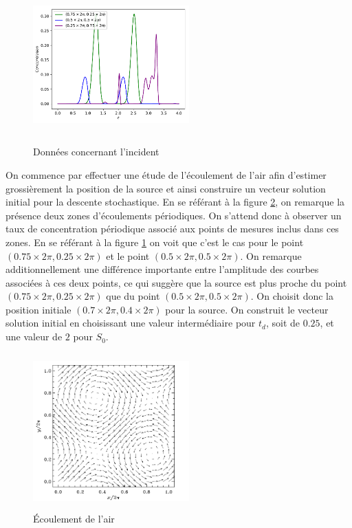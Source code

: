 \documentclass{article}
\begin{document}
\begin{figure}[H]
	\includegraphics[width=6cm, height=6cm]{img/incidentData.pdf}
	\centering
	\caption{Données concernant l'incident}
	\label{fig:dataGraph}
\end{figure}

On commence par effectuer une étude de l'écoulement de l'air afin d'estimer grossièrement la position de la source et ainsi construire un vecteur solution initial pour la descente stochastique. En se référant à la figure \ref{fig:vents}, on remarque la présence deux zones d'écoulements périodiques. On s'attend donc à observer un taux de concentration périodique associé aux points de mesures inclus dans ces zones. En se référant à la figure \ref{fig:dataGraph} on voit que c'est le cas pour le point $(0.75\times2\pi, 0.25\times2\pi)$ et le point  $(0.5\times2\pi, 0.5\times2\pi)$. On remarque additionnellement une différence importante entre l'amplitude des courbes associées à ces deux points, ce qui suggère que la source est plus proche du point $(0.75\times2\pi, 0.25\times2\pi)$ que du point $(0.5\times2\pi, 0.5\times2\pi)$. On choisit donc la position initiale $(0.7\times2\pi, 0.4\times2\pi)$ pour la source. On construit le vecteur solution initial en choisissant une valeur intermédiaire pour $t_d$, soit de $0.25$, et une valeur de $2$ pour $S_0$.

\begin{figure}[H]
	\includegraphics[width=6cm, height=6cm]{img/vents.png}
	\centering
	\caption{Écoulement de l'air \cite{notes_cours}}
	\label{fig:vents}
\end{figure}
\end{document}
